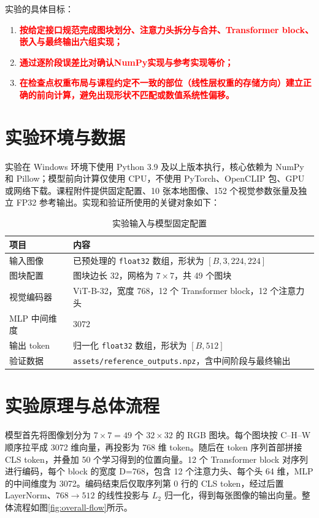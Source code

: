 \documentclass[a4paper,12pt]{article}
\newcommand{\studenthighlight}[1]{\textcolor{red}{\textbf{#1}}}
\begin{document}
实验的具体目标：
\begin{enumerate}
    \item \studenthighlight{按给定接口规范完成图块划分、注意力头拆分与合并、Transformer block、嵌入与最终输出六组实现；}
    \item \studenthighlight{通过逐阶段误差比对确认NumPy实现与参考实现等价；}
    \item \studenthighlight{在检查点权重布局与课程约定不一致的部位（线性层权重的存储方向）建立正确的前向计算，避免出现形状不匹配或数值系统性偏移。}
\end{enumerate}

\section{实验环境与数据}

实验在 Windows 环境下使用 Python 3.9 及以上版本执行，核心依赖为 NumPy 和 Pillow；模型前向计算仅使用 CPU，不使用 PyTorch、OpenCLIP 包、GPU 或网络下载。课程附件提供固定配置、10 张本地图像、152 个视觉参数张量及独立 FP32 参考输出。实现和验证所使用的关键对象如下：

\begin{table}[H]
\centering
\small
\caption{实验输入与模型固定配置}
\label{tab:environment}
\begin{tabular}{l l}
\toprule
项目 & 内容 \\
\midrule
输入图像 & 已预处理的 \texttt{float32} 数组，形状为 $[B,3,224,224]$ \\
图块配置 & 图块边长 $32$，网格为 $7\times7$，共 49 个图块 \\
视觉编码器 & ViT-B-32，宽度 $768$，12 个 Transformer block，12 个注意力头 \\
MLP 中间维度 & $3072$ \\
输出 token & 归一化 \texttt{float32} 数组，形状为 $[B,512]$ \\
验证数据 & \texttt{assets/reference\_outputs.npz}，含中间阶段与最终输出 \\
\bottomrule
\end{tabular}
\end{table}

\section{实验原理与总体流程}

模型首先将图像划分为 $7\times7=49$ 个 $32\times32$ 的 RGB 图块。每个图块按 C--H--W 顺序拉平成 3072 维向量，再投影为 768 维 token。随后在 token 序列首部拼接 CLS token，并叠加 50 个学习得到的位置向量。12 个 Transformer block 对序列进行编码，每个 block 的宽度 D=768，包含 12 个注意力头、每个头 64 维，MLP 的中间维度为 3072。编码结束后仅取序列第 0 行的 CLS token，经过后置 LayerNorm、$768\rightarrow512$ 的线性投影与 $L_2$ 归一化，得到每张图像的输出向量。整体流程如图\ref{fig:overall-flow}所示。
\end{document}
